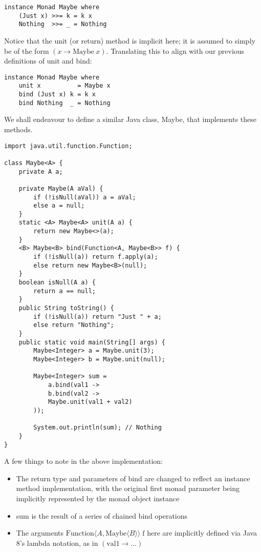 \begin{verbatim}
instance Monad Maybe where
    (Just x) >>= k = k x
    Nothing  >>= _ = Nothing
\end{verbatim}

Notice that the unit (or return) method is implicit here; it is assumed to simply be of the form $(x \to \mathrm{Maybe}\;x)$. Translating this to align with our previous definitions of unit and bind:

\begin{verbatim}
instance Monad Maybe where
    unit x          = Maybe x
    bind (Just x) k = k x
    bind Nothing  _ = Nothing
\end{verbatim}

We shall endeavour to define a similar Java class, Maybe, that implements these methods.

\begin{verbatim}
import java.util.function.Function;

class Maybe<A> {
    private A a;

    private Maybe(A aVal) {
        if (!isNull(aVal)) a = aVal;
        else a = null;
    }
    static <A> Maybe<A> unit(A a) {
        return new Maybe<>(a);
    }
    <B> Maybe<B> bind(Function<A, Maybe<B>> f) {
        if (!isNull(a)) return f.apply(a);
        else return new Maybe<B>(null);
    }
    boolean isNull(A a) {
        return a == null;
    }
    public String toString() {
        if (!isNull(a)) return "Just " + a;
        else return "Nothing";
    }
    public static void main(String[] args) {
        Maybe<Integer> a = Maybe.unit(3);
        Maybe<Integer> b = Maybe.unit(null);
        
        Maybe<Integer> sum = 
            a.bind(val1 -> 
            b.bind(val2 -> 
            Maybe.unit(val1 + val2)  
        ));

        System.out.println(sum); // Nothing
    }
}
\end{verbatim}

A few things to note in the above implementation:

\begin{itemize}
    \item The return type and parameters of bind are changed to reflect an instance method implementation, with the original first monad parameter being implicitly represented by the monad object instance
    \item sum is the result of a series of chained bind operations
    \item The arguments $\mathrm{Function}\langle A, \mathrm{Maybe}\langle B\rangle\rangle\;\mathrm{f}$ here are implicitly defined via Java 8's lambda notation, as in $(\mathrm{val1} \to \ldots)$
\end{itemize}

